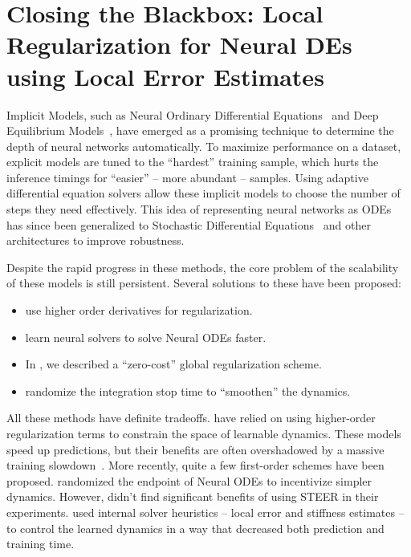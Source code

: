 \chapter{Closing the Blackbox: Local Regularization for Neural DEs using Local Error Estimates}
\label{chapter:local_regularization_neural_odes}

Implicit Models, such as Neural Ordinary Differential Equations~\cite{chen2018neural} and Deep Equilibrium Models~\cite{bai2019deep, pal2022mixing}, have emerged as a promising technique to determine the depth of neural networks automatically. To maximize performance on a dataset, explicit models are tuned to the ``hardest'' training sample, which hurts the inference timings for ``easier'' -- more abundant -- samples. Using adaptive differential equation solvers allow these implicit models to choose the number of steps they need effectively. This idea of representing neural networks as ODEs has since been generalized to Stochastic Differential Equations~\citep{liu2019neural, rackauckas2020universal} and other architectures to improve robustness.

Despite the rapid progress in these methods, the core problem of the scalability of these models is still persistent. Several solutions to these have been proposed:
%
\begin{itemize}
  \item \citet{kelly2020learning, finlay2020train} use higher order derivatives for regularization.
  \item \citet{poli2020hypersolvers} learn neural solvers to solve Neural ODEs faster.
  \item In , we described a ``zero-cost'' global regularization scheme.
  \item \citet{ghosh2020steer} randomize the integration stop time to ``smoothen'' the dynamics.
\end{itemize}
%
All these methods have definite tradeoffs. \citet{finlay2020train, kelly2020learning} have relied on using higher-order regularization terms to constrain the space of learnable dynamics. These models speed up predictions, but their benefits are often overshadowed by a massive training slowdown~\citep{pal2021opening}. More recently, quite a few first-order schemes have been proposed. \citet{ghosh2020steer} randomized the endpoint of Neural ODEs to incentivize simpler dynamics. However, \citet{pal2021opening} didn't find significant benefits of using STEER in their experiments. \citet{pal2021opening} used internal solver heuristics -- local error and stiffness estimates -- to control the learned dynamics in a way that decreased both prediction and training time.

